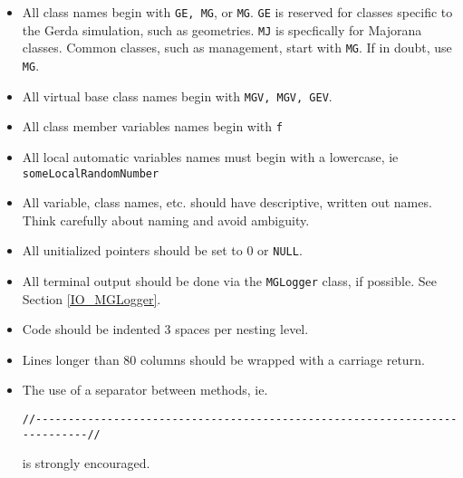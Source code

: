 \begin{itemize}

\item{}           All class names begin with \texttt{G\-E\-, M\-G},
	  or \texttt{M\-G}. 
 \texttt{G\-E} is reserved for classes specific
	  to the Gerda simulation, such as geometries. 
 \texttt{M\-J} is specfically for Majorana 
	  classes. Common classes, such as management, start with 
 \texttt{M\-G}. If in doubt, use 
 \texttt{M\-G}.
 


\item{}           All virtual base class names begin with 
 \texttt{M\-G\-V\-, M\-G\-V\-, G\-E\-V}.
 


\item{}           All class member variables names begin with 
 \texttt{f}  


\item{}           All local automatic variables names must begin with a lowercase, ie 
 \texttt{s\-o\-m\-e\-L\-o\-c\-a\-l\-R\-a\-n\-d\-o\-m\-N\-u\-m\-b\-e\-r}  


\item{}          All variable, class names, etc. should have descriptive, 
         written out names. Think carefully about naming and avoid ambiguity.
 


\item{}          All unitialized pointers should be set to 0 or 
 \texttt{N\-U\-L\-L}.
 


\item{}          All terminal output should be done via the 
 \nolinkurl{MGLogger} class, if possible. 
	 See Section \ref{IO_MGLogger}. 
 


\item{}          Code should be indented 3 spaces per nesting level. 
 


\item{}          Lines longer than 80 columns should be wrapped with a carriage return.
 


\item{}          The use of a separator between methods, ie.
 

\begin{lstlisting}
//---------------------------------------------------------------------------//
\end{lstlisting}

          is strongly encouraged.
 

\end{itemize}


